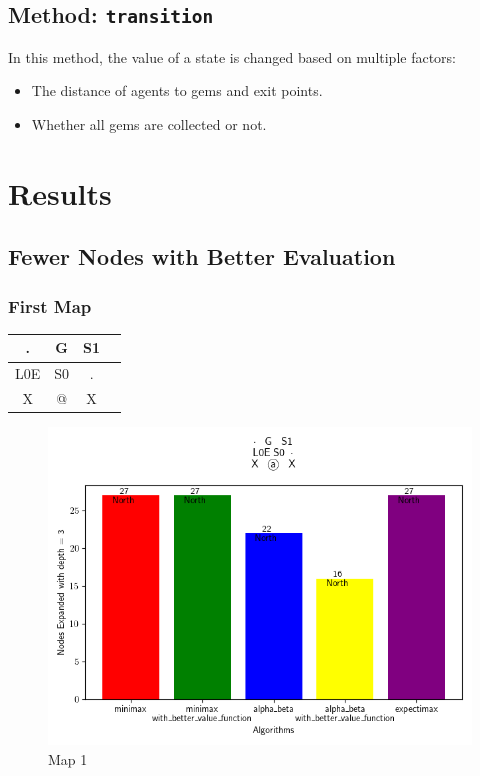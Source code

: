 \documentclass{article}
\begin{document}
\subsection{Method: \texttt{transition}}
In this method, the value of a state is changed based on multiple factors:
\begin{itemize}
    \item The distance of agents to gems and exit points.
    \item Whether all gems are collected or not.
\end{itemize}

\newpage
\section{Results}
\subsection{Fewer Nodes with Better Evaluation}
\subsubsection{First Map}

\begin{table}[h]
    \centering
    \begin{tabular}{|c|c|c|c|}
    \hline
    . & G & S1 \\
    \hline
    L0E & S0 & .\\
    \hline
    X & @ & X \\
    \hline
    \end{tabular}
    \label{tab:example_grid}
\end{table}

\begin{figure}[h]
    \centering
    \includegraphics[width=\textwidth]{media/map2023_10_29_13_48_15.png}
    \caption{Map 1}
    \label{fig:image1}
\end{figure}
\vspace{1em}
\end{document}
